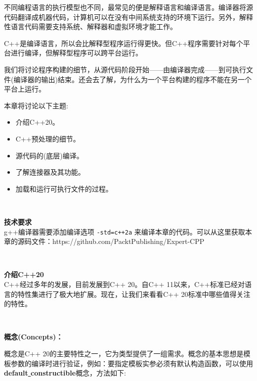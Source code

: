 不同编程语言的执行模型也不同，最常见的便是解释语言和编译语言。编译器将源代码翻译成机器代码，计算机可以在没有中间系统支持的环境下运行。另外，解释性语言代码需要支持系统、解释器和虚拟环境才能工作。 \par
C++是编译语言，所以会比解释型程序运行得更快。但C++程序需要针对每个平台进行编译，但解释型程序可以跨平台运行。 \par
我们将讨论程序构建的细节，从源代码阶段开始——由编译器完成——到可执行文件(编译器的输出)结束。还会去了解，为什么为一个平台构建的程序不能在另一个平台上运行。 \par
本章将讨论以下主题: \par

\begin{itemize}
	\item 介绍C++20。
	\item C++预处理的细节。
	\item 源代码的(底层)编译。
	\item 了解连接器及其功能。
	\item 加载和运行可执行文件的过程。
\end{itemize}

\noindent\textbf{}\ \par
\textbf{技术要求} \\
g++编译器需要添加编译选项 \texttt{-std=c++2a} 来编译本章的代码。可以从这里获取本章的源码文件：https:/​/github.​com/PacktPublishing/Expert-CPP \par

\noindent\textbf{}\ \par
\textbf{介绍C++20} \\
C++经过多年的发展，目前发展到C++ 20。自C++ 11以来，C++标准已经对语言的特性集进行了极大地扩展。现在，让我们来看看C++ 20标准中哪些值得关注的特性。 \par

\noindent\textbf{}\ \par
\textbf{概念(Concepts)：}\ \par
概念是C++ 20的主要特性之一，它为类型提供了一组需求。概念的基本思想是模板参数的编译时进行验证，例如：要指定模板实参必须有默认构造函数，可以使用\textbf{default\underline{ }constructible}概念，方法如下: \par
\noindent\textbf{}\ \par

	
